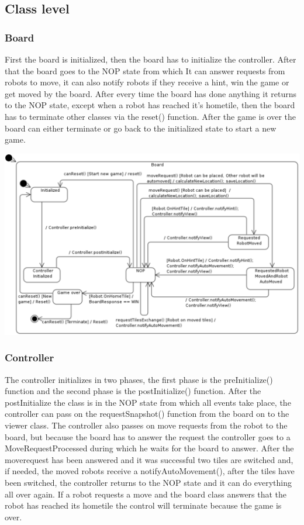 \subsection{Class level}
	\subsubsection{Board}
	First the board is initialized, then the board has to initialize the controller. After that the board goes to the NOP state from which It can answer requests from robots to move, it can also notify robots if they receive a hint, win the game or get moved by the board. After every time the board has done anything it returns to the NOP state, except when a robot has reached it's hometile, then the board has to terminate other classes via the reset() function. After the game is over the board can either terminate or go back to the initialized state to start a new game.
	
	\includegraphics[width=\linewidth]{statecharts/board.pdf}

	\subsubsection{Controller}
	The controller initializes in two phases, the first phase is the preInitialize() function and the second phase is the postInitialize() function. After the postInitialize the class is in the NOP state from which all events take place, the controller can pass on the requestSnapshot() function from the board on to the viewer class. The controller also passes on move requests from the robot to the board, but because the  board has to answer the request the controller goes to a MoveRequestProcessed during which he waits for the board to answer. After the moverequest has been answered and it was successful two tiles are switched and, if needed, the moved robots receive a notifyAutoMovement(), after the tiles have been switched, the controller returns to the NOP state and it can do everything all over again. If a robot requests a move and the board class answers that the robot has reached its hometile the control will terminate because the game is over.

